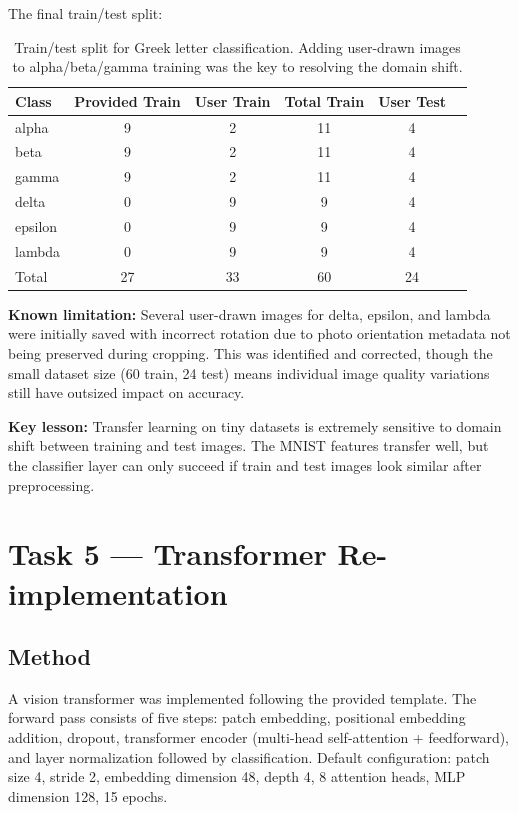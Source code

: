 \documentclass[11pt]{article}
\begin{document}
The final train/test split:

\begin{table}[H]
    \centering
    \begin{tabular}{lccccc}
        \toprule
        Class & Provided Train & User Train & Total Train & User Test \\
        \midrule
        alpha   & 9 & 2 & 11 & 4 \\
        beta    & 9 & 2 & 11 & 4 \\
        gamma   & 9 & 2 & 11 & 4 \\
        delta   & 0 & 9 &  9 & 4 \\
        epsilon & 0 & 9 &  9 & 4 \\
        lambda  & 0 & 9 &  9 & 4 \\
        \midrule
        Total   & 27 & 33 & 60 & 24 \\
        \bottomrule
    \end{tabular}
    \caption{Train/test split for Greek letter classification. Adding
    user-drawn images to alpha/beta/gamma training was the key to
    resolving the domain shift.}
\end{table}

\textbf{Known limitation:} Several user-drawn images for delta, epsilon,
and lambda were initially saved with incorrect rotation due to photo
orientation metadata not being preserved during cropping. This was
identified and corrected, though the small dataset size (60 train, 24
test) means individual image quality variations still have outsized
impact on accuracy.

\textbf{Key lesson:} Transfer learning on tiny datasets is extremely
sensitive to domain shift between training and test images. The MNIST
features transfer well, but the classifier layer can only succeed if
train and test images look similar after preprocessing.

\section{Task 5 --- Transformer Re-implementation}

\subsection{Method}

A vision transformer was implemented following the provided template.
The forward pass consists of five steps: patch embedding, positional
embedding addition, dropout, transformer encoder (multi-head
self-attention + feedforward), and layer normalization followed by
classification. Default configuration: patch size 4, stride 2,
embedding dimension 48, depth 4, 8 attention heads, MLP dimension 128,
15 epochs.
\end{document}
